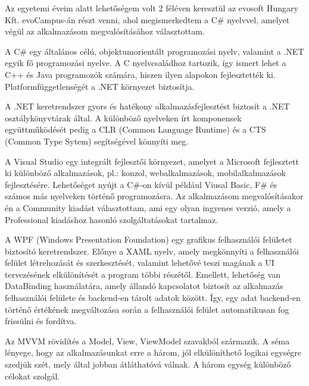 




Az egyetemi éveim alatt lehetőségem volt 2 féléven keresztül az evosoft Hungary Kft. evoCampus-án részt venni, ahol megismerkedtem a C\# nyelvvel, amelyet végül az alkalmazásom megvalósításához választottam.

A C\# egy általános célú, objektumorientált programozási nyelv, valamint a .NET egyik fő programozási nyelve. A C nyelvcsaládhoz tartozik, így ismert lehet a C++ és Java programozók számára, hiszen ilyen alapokon fejlesztették ki. Platformfüggetlenségét a .NET környezet biztosítja.

A .NET keretrendszer gyors és hatékony alkalmazásfejlesztést biztosít a .NET osztálykönyvtárak által. A különböző nyelveken írt komponensek együttműködését pedig a CLR (Common Language Runtime) és a CTS (Common Type Sytem) segítségével könnyíti meg.



A Visual Studio egy integrált fejlesztői környezet, amelyet a Microsoft fejlesztett ki különböző alkalmazások, pl.: konzol, webalkalmazások, mobilalkalmazások fejlesztésére. Lehetőséget nyújt a C\#-on kívül például Viusal Basic, F\# és számos más nyelveken történő programozásra.  Az alkalmazásom megvalósításakor én a Community kiadást választottam, ami egy olyan ingyenes verzió, amely a Professional kiadáshoz hasonló szolgáltatásokat tartalmaz.



A WPF (Windows Presentation Foundation) egy grafikus felhasználói felületet biztosító keretrendszer. Előnye a XAML nyelv, amely megkönnyíti a felhasználói felület létrehozását és szerkesztését, valamint lehetővé teszi magának a UI tervezésének elkülönítését a program többi részétől. Emellett, lehetőség van DataBinding használatára, amely állandó kapcsolatot biztosít az alkalmazás felhasználói felülete és backend-en tárolt adatok között. Így, egy adat backend-en történő értékének megváltozása során a felhasználói felület automatikusan fog frissülni és fordítva.


Az MVVM rövidítés a Model, View, ViewModel szavakból származik. A séma lényege, hogy az alkalmazásunkat erre a három, jól elkülöníthető logikai egységre szedjük szét, mely által jobban átláthatóvá válnak. A három egység különböző célokat szolgál.


